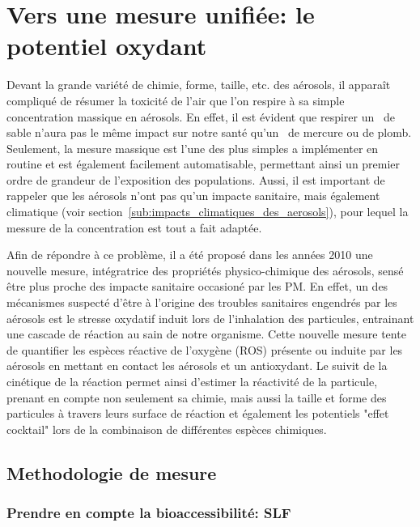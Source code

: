 \section{Vers une mesure unifiée: le potentiel oxydant}%
\label{sec:le_potentiel_oxydant_des_aerosols}

Devant la grande variété de chimie, forme, taille, etc. des aérosols, il apparaît
compliqué de résumer la toxicité de l'air que l'on respire à sa simple concentration
massique en aérosols. En effet, il est évident que respirer un~\ugm{} de sable n'aura pas
le même impact sur notre santé qu'un~\ugm{} de mercure ou de plomb.
Seulement, la mesure massique est l'une des plus simples a implémenter en routine et est
également facilement automatisable, permettant ainsi un premier ordre de grandeur de 
l'exposition des populations. Aussi, il est important de rappeler que les aérosols n'ont
pas qu'un impacte sanitaire, mais également climatique (voir
section~\ref{sub:impacts_climatiques_des_aerosols}), pour lequel la messure de la concentration est tout a
fait adaptée.

Afin de répondre à ce problème, il a été proposé dans les années 2010 une nouvelle mesure,
intégratrice des propriétés physico-chimique des aérosols, sensé être plus proche des
impacte sanitaire occasioné par les PM. En effet, un des mécanismes suspecté d'être à
l'origine des troubles sanitaires engendrés par les aérosols est le stresse oxydatif
induit lors de l'inhalation des particules, entrainant une cascade de réaction au sain de
notre organisme.
Cette nouvelle mesure tente de quantifier les espèces réactive de l'oxygène (ROS) présente
ou induite par les aérosols en mettant en contact les aérosols et un antioxydant.
Le suivit de la cinétique de la réaction permet ainsi d'estimer la réactivité de la
particule, prenant en compte non seulement sa chimie, mais aussi la taille et forme des
particules à travers leurs surface de réaction et également les potentiels "effet
cocktail" lors de la combinaison de différentes espèces chimiques.

\subsection{Methodologie de mesure}%
\label{sub:methodologie_de_mesure}

\subsubsection{Prendre en compte la bioaccessibilité: SLF}%
\label{sub:prendre_en_compte_la_bioaccessibilite_slf}

